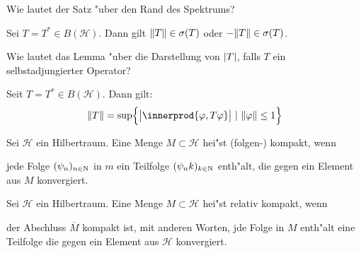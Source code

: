 \documentclass[9pt]{article}
\DeclarePairedDelimiter{\innerprod}\langle\rangle
\newcommand{\Hi}{\mathcal{H}}
\newenvironment{field}{}{\newpage}
\newif\ifnote
\newenvironment{note}{\notetrue}{\notefalse}
\newcommand{\localtag}{}
\newcommand{\globaltag}{}
\newcommand{\uuid}{}
\newcommand{\tags}[1]{
    \ifnote 
        \renewcommand{\localtag}{#1}
    \else
        \renewcommand{\globaltag}{#1}
    \fi 
    }
\newcommand{\xplain}[1]{\renewcommand{\uuid}{#1}}
\begin{document}
	\begin{note}
		\xplain{64f8c427-8cfb-487e-a0f3-d9878517ecd7}
		\tags{6.4.2}
		
		\begin{field}  %
			Wie lautet der Satz "uber den Rand des Spektrums?
		\end{field}
		
		\begin{field}  %
			Sei $T=T^* \in B(\Hi)$. Dann gilt $\norm{T} \in \sigma(T)$ oder $-\norm{T} \in \sigma(T)$.
		\end{field}
	\end{note}
\begin{note}
	\xplain{d3eb783b-ec94-4980-8b2a-f7a76018c965}
	\tags{6.4.3}
	
	\begin{field}  %
		Wie lautet das Lemma "uber die Darstellung von $\abs{T}$, falls $T$ ein selbstadjungierter Operator?
	\end{field}
	
	\begin{field}  %
		Seit $T=T^* \in B(\Hi)$. Dann gilt:
		\begin{equation*}
			\norm{T}= \text{sup}\qty{\abs{\innerprod{\varphi,T\varphi}} \ | \ \norm{\varphi} \leq 1}
		\end{equation*}
	\end{field}
\end{note}
\begin{note}
	\xplain{c394653d-6873-4c47-9291-141276a64b82}
	\tags{7.1}
	
	\begin{field}  %
		Sei $\Hi$ ein Hilbertraum. Eine Menge $M\subset\Hi$ hei"st (folgen-) kompakt, wenn 
	\end{field}
	
	\begin{field}  %
		jede Folge $(\psi_n)_{n\in \N{}}$ in $m$ ein Teilfolge $(\psi_nk)_{k\in \N{}}$ enth"alt, die gegen ein Element aus $M$ konvergiert. 
	\end{field}
		
	\begin{field}  %
		Sei $\Hi$ ein Hilbertraum. Eine Menge $M\subset\Hi$ hei"st relativ kompakt, wenn 
	\end{field}
	
	\begin{field}  %
		der Abschluss $\overline{M}$ kompakt ist, mit anderen Worten, jde Folge in $M$ enth"alt eine Teilfolge die gegen ein Element aus $\Hi$ konvergiert. 
	\end{field}
\end{note}
\end{document}
